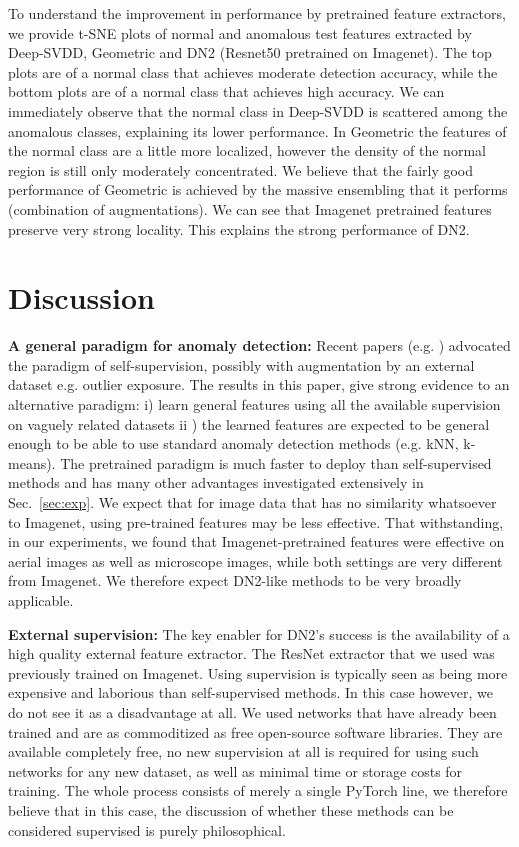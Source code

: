 \documentclass{article}
\begin{document}
To understand the improvement in performance by pretrained feature extractors, we provide t-SNE plots of normal and anomalous test features extracted by Deep-SVDD, Geometric and DN2 (Resnet50 pretrained on Imagenet). The top plots are of a normal class that achieves moderate detection accuracy, while the bottom plots are of a normal class that achieves high accuracy. We can immediately observe that the normal class in Deep-SVDD is scattered among the anomalous classes, explaining its lower performance. In Geometric the features of the normal class are a little more localized, however the density of the normal region is still only moderately concentrated. We believe that the fairly good performance of Geometric is achieved by the massive ensembling that it performs (combination of  augmentations). We can see that Imagenet pretrained features preserve very strong locality. This explains the strong performance of DN2. 

\section{Discussion}
\label{sec:disc}

\textbf{A general paradigm for anomaly detection:} Recent papers (e.g. \citet{golan2018deep}) advocated the paradigm of self-supervision, possibly with augmentation by an external dataset e.g. outlier exposure. The results in this paper, give strong evidence to an alternative paradigm: i) learn general features using all the available supervision on vaguely related datasets ii ) the learned features are expected to be general enough to be able to use standard anomaly detection methods (e.g. kNN, k-means). The pretrained paradigm is much faster to deploy than self-supervised methods and has many other advantages investigated extensively in Sec.~\ref{sec:exp}. We expect that for image data that has no similarity whatsoever to Imagenet, using pre-trained features may be less effective. That withstanding, in our experiments, we found that Imagenet-pretrained features were effective on aerial images as well as microscope images, while both settings are very different from Imagenet. We therefore expect DN2-like methods to be very broadly applicable.

\textbf{External supervision:} The key enabler for DN2's success is the availability of a high quality external feature extractor. The ResNet extractor that we used was previously trained on Imagenet. Using supervision is typically seen as being more expensive and laborious than self-supervised methods. In this case however, we do not see it as a disadvantage at all. We used networks that have already been trained and are as commoditized as free open-source software libraries. They are available completely free, no new supervision at all is required for using such networks for any new dataset, as well as minimal time or storage costs for training. The whole process consists of merely a single PyTorch line, we therefore believe that in this case, the discussion of whether these methods can be considered supervised is purely philosophical.
\end{document}
